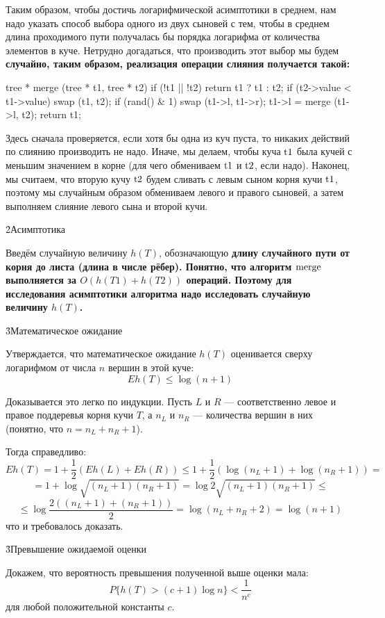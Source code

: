 Таким образом, чтобы достичь логарифмической асимптотики в среднем, нам надо указать способ выбора одного из двух сыновей с тем, чтобы в среднем длина проходимого пути получалась бы порядка логарифма от количества элементов в куче. Нетрудно догадаться, что производить этот выбор мы будем \bf{случайно}, таким образом, реализация операции слияния получается такой:

\code
tree * merge (tree * t1, tree * t2) {
	if (!t1 || !t2)
		return t1 ? t1 : t2;
	if (t2->value < t1->value)
		swap (t1, t2);
	if (rand() & 1)
		swap (t1->l, t1->r);
	t1->l = merge (t1->l, t2);
	return t1;
}
\endcode

Здесь сначала проверяется, если хотя бы одна из куч пуста, то никаких действий по слиянию производить не надо. Иначе, мы делаем, чтобы куча $\rm t1$ была кучей с меньшим значением в корне (для чего обмениваем $\rm t1$ и $\rm t2$, если надо). Наконец, мы считаем, что вторую кучу $\rm t2$ будем сливать с левым сыном корня кучи $\rm t1$, поэтому мы случайным образом обмениваем левого и правого сыновей, а затем выполняем слияние левого сына и второй кучи.

\h2{Асимптотика}

Введём случайную величину $h(T)$, обозначающую \bf{длину случайного пути} от корня до листа (длина в числе рёбер). Понятно, что алгоритм $\rm merge$ выполняется за $O(h(T1)+h(T2))$ операций. Поэтому для исследования асимптотики алгоритма надо исследовать случайную величину $h(T)$.

\h3{Математическое ожидание}

Утверждается, что математическое ожидание $h(T)$ оценивается сверху логарифмом от числа $n$ вершин в этой куче:
$$ Eh(T) \le \log(n+1) $$

Доказывается это легко по индукции. Пусть $L$ и $R$ --- соответственно левое и правое поддеревья корня кучи $T$, а $n_L$ и $n_R$ --- количества вершин в них (понятно, что $n = n_L+n_R+1$).

Тогда справедливо:
$$ Eh(T) = 1 + \frac{1}{2}(Eh(L) + Eh(R)) \le 1 + \frac{1}{2}(\log(n_L+1) + \log(n_R+1)) = $$
$$ = 1 + \log \sqrt{ (n_L+1)(n_R+1) } = \log 2 \sqrt{ (n_L+1)(n_R+1) } \le $$
$$ \le \log \frac{ 2 ((n_L+1) + (n_R+1)) }{ 2 } = \log (n_L + n_R + 2) = \log(n+1) $$
что и требовалось доказать.

\h3{Превышение ожидаемой оценки}

Докажем, что вероятность превышения полученной выше оценки мала:
$$ P\{ h(T) > (c+1) \log n \} < \frac{1}{n^c} $$
для любой положительной константы $c$.

